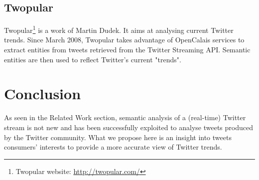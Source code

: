 \documentclass[runningheads,a4paper]{llncs}
\begin{document}
\subsection{Twopular}

Twopular\footnote{Twopular website: \url{http://twopular.com/}} is a work of Martin Dudek. It aims at analysing current Twitter trends.
Since March 2008, Twopular takes advantage of OpenCalais services to extract entities from tweets retrieved from the Twitter Streaming API. \linebreak
Semantic entities are then used to reflect Twitter's current "trends".

\section{Conclusion}
As seen in the Related Work section, semantic analysis of a (real-time) Twitter stream is not new and has been successfully exploited to analyse tweets produced by the Twitter community.
What we propose here is an insight into tweets consumers' interests to provide a more accurate view of Twitter trends.




\end{document}
